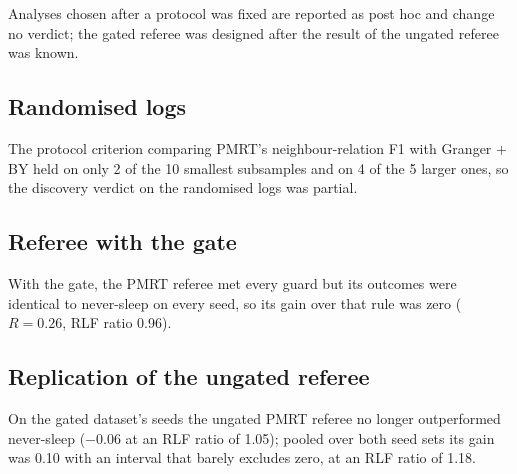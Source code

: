Analyses chosen after a protocol was fixed are reported as post hoc and change no verdict; the gated referee was designed after the result of the ungated referee was known.

\subsection{Randomised logs}
\label{spec:pro.study1}

The protocol criterion comparing PMRT's neighbour-relation F1 with Granger + BY held on only 2 of the 10 smallest subsamples and on 4 of the 5 larger ones, so the discovery verdict on the randomised logs was partial.

\subsection{Referee with the gate}
\label{spec:pro.study3}

With the gate, the PMRT referee met every guard but its outcomes were identical to never-sleep on every seed, so its gain over that rule was zero ($R = 0.26$, RLF ratio 0.96).

\subsection{Replication of the ungated referee}
\label{spec:pro.x15}

On the gated dataset's seeds the ungated PMRT referee no longer outperformed never-sleep ($-0.06$ at an RLF ratio of 1.05); pooled over both seed sets its gain was 0.10 with an interval that barely excludes zero, at an RLF ratio of 1.18.

